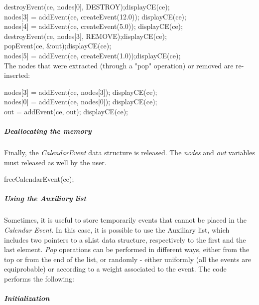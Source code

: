 {destroyEvent(ce, nodes[0], DESTROY);displayCE(ce);\\
nodes[3] = addEvent(ce, createEvent(12.0));	displayCE(ce);\\
nodes[4] = addEvent(ce, createEvent(5.0));	displayCE(ce);\\
destroyEvent(ce, nodes[3], REMOVE);displayCE(ce);\\
popEvent(ce, \&out);displayCE(ce);\\
nodes[5] = addEvent(ce, createEvent(1.0));displayCE(ce);\\


The nodes that were extracted (through a "pop" operation) or removed are re-inserted:

nodes[3] = addEvent(ce, nodes[3]);	displayCE(ce); \\
nodes[0] = addEvent(ce, nodes[0]);	displayCE(ce); \\
out = addEvent(ce, out);	displayCE(ce); \\

\subparagraph{Deallocating the memory}

Finally, the \textit{CalendarEvent} data structure is released. The \textit{nodes} and \textit{out} variables must released as well by the user.

freeCalendarEvent(ce);\\
}

\subparagraph{Using the Auxiliary list}

Sometimes, it is useful to store temporarily events that cannot be placed in the \textit{Calendar Event}. In this case, it is possible to use the Auxiliary list, which includes two pointers
to a sList data structure, respectively to the first and the last element. \textit{Pop} operations can be performed in different ways, either from the top or from the end of the list, or randomly - either
uniformly (all the events are equiprobable) or according to a weight associated to the event. The code performs the following:

\subparagraph{Initialization}

